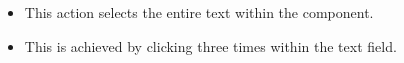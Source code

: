 \begin{itemize}
\item This action selects the entire text within the component.
\item This is achieved by clicking three times within the text field.
\end{itemize}

